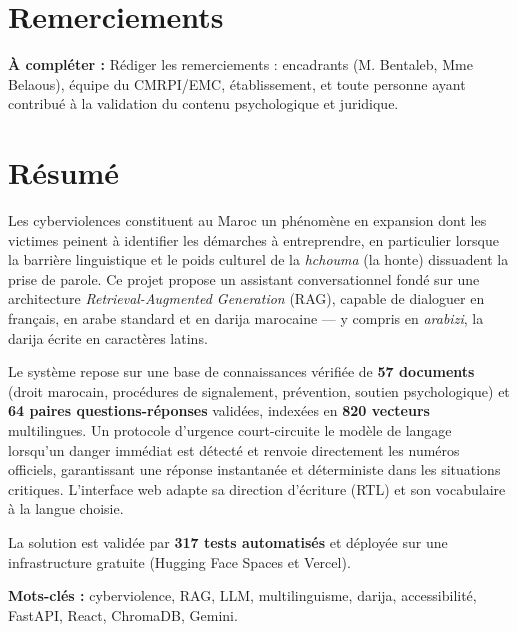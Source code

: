 \documentclass[a4paper,11pt,twoside]{report}
\newcommand{\todo}[1]{%
  \begin{tcolorbox}[colback=yellow!12,colframe=orange!70!black,left=4pt,right=4pt,top=3pt,bottom=3pt]
  \small\textbf{À compléter :} #1
  \end{tcolorbox}}
\begin{document}
\chapter*{Remerciements}

\todo{Rédiger les remerciements : encadrants (M. Bentaleb, Mme Belaous), équipe
du CMRPI/EMC, établissement, et toute personne ayant contribué à la validation
du contenu psychologique et juridique.}

\chapter*{Résumé}

Les cyberviolences constituent au Maroc un phénomène en expansion dont les
victimes peinent à identifier les démarches à entreprendre, en particulier
lorsque la barrière linguistique et le poids culturel de la \emph{hchouma}
(la honte) dissuadent la prise de parole. Ce projet propose un assistant
conversationnel fondé sur une architecture \emph{Retrieval-Augmented
Generation} (RAG), capable de dialoguer en français, en arabe standard et en
darija marocaine — y compris en \emph{arabizi}, la darija écrite en caractères
latins.

Le système repose sur une base de connaissances vérifiée de
\textbf{57 documents} (droit marocain, procédures de signalement, prévention,
soutien psychologique) et \textbf{64 paires questions-réponses} validées,
indexées en \textbf{820 vecteurs} multilingues. Un protocole d'urgence
court-circuite le modèle de langage lorsqu'un danger immédiat est détecté et
renvoie directement les numéros officiels, garantissant une réponse instantanée
et déterministe dans les situations critiques. L'interface web adapte sa
direction d'écriture (RTL) et son vocabulaire à la langue choisie.

La solution est validée par \textbf{317 tests automatisés} et déployée sur une
infrastructure gratuite (Hugging Face Spaces et Vercel).

\vspace{0.4cm}
\noindent\textbf{Mots-clés :} cyberviolence, RAG, LLM, multilinguisme, darija,
accessibilité, FastAPI, React, ChromaDB, Gemini.

\end{document}
